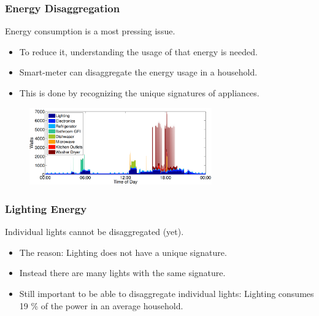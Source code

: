 \documentclass{beamer}
\begin{document}
	\begin{frame}\frametitle{Energy Disaggregation}

		Energy consumption is a most pressing issue.

		\begin{itemize}

			\item To reduce it, understanding the usage of that energy is needed.

			\item Smart-meter can disaggregate the energy usage in a household.

			\item This is done by recognizing the unique signatures of appliances.

		\end{itemize}

		\begin{figure}[t]
			\centering
			\includegraphics[width=0.7\textwidth]{../chapters/introduction-chapters/energy-consumption-house.png}
		\end{figure}


	\end{frame}






	\begin{frame}\frametitle{Lighting Energy}

		Individual lights cannot be disaggregated (yet).

		\begin{itemize}

			\item The reason: Lighting does not have a unique signature. %

			\item Instead there are many lights with the same signature.

			\item Still important to be able to disaggregate individual lights: Lighting consumes 19 \% of the power in an average household.

		\end{itemize}


	\end{frame}
\end{document}
